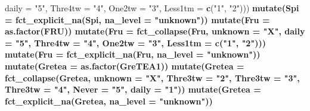 \documentclass[
]{article}
\newenvironment{Shaded}{\begin{snugshade}}{\end{snugshade}}
\newcommand{\CommentTok}[1]{\textcolor[rgb]{0.56,0.35,0.01}{\textit{#1}}}
\newcommand{\DataTypeTok}[1]{\textcolor[rgb]{0.13,0.29,0.53}{#1}}
\newcommand{\KeywordTok}[1]{\textcolor[rgb]{0.13,0.29,0.53}{\textbf{#1}}}
\newcommand{\NormalTok}[1]{#1}
\newcommand{\OperatorTok}[1]{\textcolor[rgb]{0.81,0.36,0.00}{\textbf{#1}}}
\newcommand{\StringTok}[1]{\textcolor[rgb]{0.31,0.60,0.02}{#1}}
\begin{document}
\begin{Shaded}
\begin{Highlighting}[]
{{{{{{{{{{{{{{{{{{{{{{{{{{{{{{{{{{{{{{                            \DataTypeTok{daily =} \StringTok{"5"}\NormalTok{,}
                            \DataTypeTok{Thre4tw =} \StringTok{"4"}\NormalTok{,}
                            \DataTypeTok{One2tw =} \StringTok{"3"}\NormalTok{,}
                            \DataTypeTok{Less1tm =} \KeywordTok{c}\NormalTok{(}\StringTok{"1"}\NormalTok{, }\StringTok{"2"}\NormalTok{))) }\OperatorTok{%
\StringTok{  }\KeywordTok{mutate}\NormalTok{(}\DataTypeTok{Spi =} \KeywordTok{fct_explicit_na}\NormalTok{(Spi, }\DataTypeTok{na_level =} \StringTok{"unknown"}\NormalTok{)) }\OperatorTok{%
\StringTok{  }\KeywordTok{mutate}\NormalTok{(}\DataTypeTok{Fru =} \KeywordTok{as.factor}\NormalTok{(FRU)) }\OperatorTok{%
\StringTok{  }\KeywordTok{mutate}\NormalTok{(}\DataTypeTok{Fru =} \KeywordTok{fct_collapse}\NormalTok{(Fru, }
                            \DataTypeTok{unknown =} \StringTok{"X"}\NormalTok{,}
                            \DataTypeTok{daily =} \StringTok{"5"}\NormalTok{,}
                            \DataTypeTok{Thre4tw =} \StringTok{"4"}\NormalTok{,}
                            \DataTypeTok{One2tw =} \StringTok{"3"}\NormalTok{,}
                            \DataTypeTok{Less1tm =} \KeywordTok{c}\NormalTok{(}\StringTok{"1"}\NormalTok{, }\StringTok{"2"}\NormalTok{))) }\OperatorTok{%
\StringTok{  }\KeywordTok{mutate}\NormalTok{(}\DataTypeTok{Fru =} \KeywordTok{fct_explicit_na}\NormalTok{(Fru, }\DataTypeTok{na_level =} \StringTok{"unknown"}\NormalTok{)) }\OperatorTok{%
\StringTok{  }\KeywordTok{mutate}\NormalTok{(}\DataTypeTok{Gretea =} \KeywordTok{as.factor}\NormalTok{(GreTEA1)) }\OperatorTok{%
\StringTok{  }\KeywordTok{mutate}\NormalTok{(}\DataTypeTok{Gretea =} \KeywordTok{fct_collapse}\NormalTok{(Gretea, }
                               \DataTypeTok{unknown =} \StringTok{"X"}\NormalTok{, }
                               \DataTypeTok{Thre3tw =} \StringTok{"2"}\NormalTok{, }
                               \DataTypeTok{Thre3tw =} \StringTok{"3"}\NormalTok{,}
                               \DataTypeTok{Thre3tw =} \StringTok{"4"}\NormalTok{,}
                               \DataTypeTok{Never =} \StringTok{"5"}\NormalTok{, }
                               \DataTypeTok{daily =} \StringTok{"1"}\NormalTok{)) }\OperatorTok{%
\StringTok{  }\KeywordTok{mutate}\NormalTok{(}\DataTypeTok{Gretea =} \KeywordTok{fct_explicit_na}\NormalTok{(Gretea, }\DataTypeTok{na_level =} \StringTok{"unknown"}\NormalTok{))  }\OperatorTok{%
}}}}}}}}}}}}}}}}}}}}}}}}}}}}}}}}}}}}}}}}}}}}}}
\end{Highlighting}
\end{Shaded}
\end{document}

